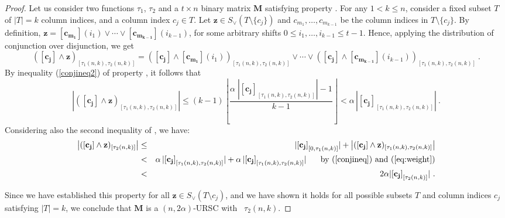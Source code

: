 \documentclass[11pt]{article}
\begin{document}
\begin{proof}
	Let us consider two functions $\tau_1$, $\tau_2$ and a $t\times n$ binary matrix $\mathbf{M}$ satisfying property \pairCondition.
    For any $1 < k \le n$,
consider a fixed subset $T$ of $|T| = k$ column indices, and a column index $c_j \in T$.  
	Let $\mathbf{z} \in S_{\vee}(T \setminus \{c_j\})$
	and $c_{m_1}, \ldots, c_{m_{k-1}}$ be the column indices in 
	$T \setminus \{c_j\}$. 
	By definition, 
	 $\mathbf{z} = \mathbf{[c_{m_1}]}(i_1) \lor \cdots \lor \mathbf{[c_{m_{k-1}}]}(i_{k-1})$,
	 for some arbitrary shifts $0 \le i_1, \ldots, i_{k-1} \le t-1$.
	 Hence, applying the distribution of conjunction over disjunction, we get
\begin{equation*}
(\mathbf{[c_j]} \land \mathbf{z})_{[\tau_1(n,k),\tau_2(n,k)]}  
	=  		 
 \left(\mathbf{[c_j]} \land \mathbf{[c_{m_1}]}(i_1) \right)_{[\tau_1(n,k),\tau_2(n,k)]} 
	\lor  \cdots \lor
	\left(\mathbf{[c_j]} \land \mathbf{[c_{m_{k-1}}]}(i_{k-1}) \right)_{[\tau_1(n,k),\tau_2(n,k)]}\ .
\end{equation*} 
By inequality (\ref{conjineq2}) of property \pairCondition, it follows that
\begin{equation}\label{eq:weight}
	|(\mathbf{[c_j]} \land \mathbf{z})_{[\tau_1(n,k),\tau_2(n,k)]} | 
	   \le  (k-1)   \left\lfloor \frac{\alpha \; |\mathbf{[c_j]}_{[\tau_1(n,k),\tau_2(n,k)]}|  - 1}{k - 1} \right\rfloor
	   < \alpha\, | \mathbf{[c_j]}_{[\tau_1(n,k),\tau_2(n,k)]} |
    \ .
\end{equation}
Considering also the second inequality of \pairCondition, we have:
\begin{eqnarray*}
	\left| (\mathbf{[c_{j}]} \wedge \mathbf{z})_{[\tau_2(n,k)]} \right| 
		&\le &  | \mathbf{[c_j]}_{[0, \tau_1(n,k) ]}| 
		           + \left| (\mathbf{[c_j]} \land \mathbf{z} )_{[\tau_1(n,k),\tau_2(n,k)]} \right| \\
&< &       \alpha\,| \mathbf{[c_j]}_{[\tau_1(n,k),\tau_2(n,k)]} |
		           + \alpha\,| \mathbf{[c_j]}_{[\tau_1(n,k),\tau_2(n,k)]} | \;\;\;\;\; 
             \text{ by (\ref{conjineq}) and (\ref{eq:weight})}\\
&< & { 2\alpha  | \mathbf{[c_j]}_{[\tau_2(n,k)]}| } 
  \ .
\end{eqnarray*}

Since we have established this property for all $\mathbf{z} \in S_{\vee}(T \setminus c_j)$, and 
we have shown it holds for all possible subsets 
 $T$ and column indices $c_j$ satisfying $|T| = k$, we conclude that $\mathbf{M}$ is a 
{$(n,2\alpha)$}-URSC with \elongation\ $\tau_2(n,k)$.
\end{proof}
\end{document}
